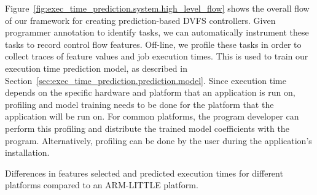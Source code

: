 Figure~\ref{fig:exec_time_prediction.system.high_level_flow} shows the overall
flow of our framework for creating prediction-based DVFS controllers. Given
programmer annotation to identify tasks, we can automatically instrument these
tasks to record control flow features. Off-line, we profile these tasks in
order to collect traces of feature values and job execution times.  This is
used to train our execution time prediction model, as described in
Section~\ref{sec:exec_time_prediction.prediction.model}. Since execution time
depends on the specific hardware and platform that an application is run on,
profiling and model training needs to be done for the platform that the
application will be run on. For common platforms, the program developer can
perform this profiling and distribute the trained model coefficients with the
program. Alternatively, profiling can be done by the user during the
application's installation.

\begin{table}
  \begin{center}
    \begin{footnotesize}
    
    \end{footnotesize}
    \caption{Differences in features selected and predicted execution times for
    different platforms compared to an ARM-LITTLE platform.}
    \label{tab:exec_time_prediction.system.slice_differences}
  \end{center}
\end{table}

